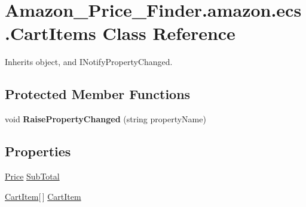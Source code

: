 \hypertarget{class_amazon___price___finder_1_1amazon_1_1ecs_1_1_cart_items}{\section{Amazon\-\_\-\-Price\-\_\-\-Finder.\-amazon.\-ecs.\-Cart\-Items Class Reference}
\label{class_amazon___price___finder_1_1amazon_1_1ecs_1_1_cart_items}
}


 




Inherits object, and I\-Notify\-Property\-Changed.

\subsection*{Protected Member Functions}
\begin{DoxyCompactItemize}
\item 
\hypertarget{class_amazon___price___finder_1_1amazon_1_1ecs_1_1_cart_items_a51082b9798cbdd92f89b74b732412d40}{void {\bfseries Raise\-Property\-Changed} (string property\-Name)}\label{class_amazon___price___finder_1_1amazon_1_1ecs_1_1_cart_items_a51082b9798cbdd92f89b74b732412d40}

\end{DoxyCompactItemize}
\subsection*{Properties}
\begin{DoxyCompactItemize}
\item 
\hypertarget{class_amazon___price___finder_1_1amazon_1_1ecs_1_1_cart_items_a7e10b9230d42326887fd93f60a970364}{\hyperlink{class_amazon___price___finder_1_1amazon_1_1ecs_1_1_price}{Price} \hyperlink{class_amazon___price___finder_1_1amazon_1_1ecs_1_1_cart_items_a7e10b9230d42326887fd93f60a970364}{Sub\-Total}}\label{class_amazon___price___finder_1_1amazon_1_1ecs_1_1_cart_items_a7e10b9230d42326887fd93f60a970364}

\begin{DoxyCompactList}\small\item\em \end{DoxyCompactList}\item 
\hypertarget{class_amazon___price___finder_1_1amazon_1_1ecs_1_1_cart_items_a7ee8bd2b1357ff6f46bf7bb04165b334}{\hyperlink{class_amazon___price___finder_1_1amazon_1_1ecs_1_1_cart_item}{Cart\-Item}\mbox{[}$\,$\mbox{]} \hyperlink{class_amazon___price___finder_1_1amazon_1_1ecs_1_1_cart_items_a7ee8bd2b1357ff6f46bf7bb04165b334}{Cart\-Item}}\label{class_amazon___price___finder_1_1amazon_1_1ecs_1_1_cart_items_a7ee8bd2b1357ff6f46bf7bb04165b334}

\begin{DoxyCompactList}\small\item\em \end{DoxyCompactList}\end{DoxyCompactItemize}
